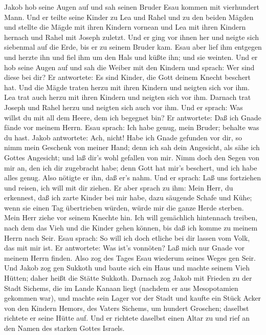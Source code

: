  Jakob hob seine Augen auf und sah seinen Bruder Esau kommen
mit vierhundert Mann. Und er teilte seine Kinder zu Lea und Rahel und zu
den beiden Mägden  und stellte die Mägde mit ihren Kindern
vornean und Lea mit ihren Kindern hernach und Rahel mit Joseph zuletzt.
 Und er ging vor ihnen her und neigte sich siebenmal auf die
Erde, bis er zu seinem Bruder kam.  Esau aber lief ihm
entgegen und herzte ihn und fiel ihm um den Hals und küßte ihn; und sie
weinten.  Und er hob seine Augen auf und sah die Weiber mit
den Kindern und sprach: Wer sind diese bei dir? Er antwortete: Es sind
Kinder, die Gott deinem Knecht beschert hat.  Und die Mägde
traten herzu mit ihren Kindern und neigten sich vor ihm. 
Lea trat auch herzu mit ihren Kindern und neigten sich vor ihm. Darnach
trat Joseph und Rahel herzu und neigten sich auch vor ihm. 
Und er sprach: Was willst du mit all dem Heere, dem ich begegnet bin? Er
antwortete: Daß ich Gnade fände vor meinem Herrn.  Esau
sprach: Ich habe genug, mein Bruder; behalte was du hast. 
Jakob antwortete: Ach, nicht! Habe ich Gnade gefunden vor dir, so nimm
mein Geschenk von meiner Hand; denn ich sah dein Angesicht, als sähe ich
Gottes Angesicht; und laß dir's wohl gefallen von mir. 
Nimm doch den Segen von mir an, den ich dir zugebracht habe; denn Gott
hat mir's beschert, und ich habe alles genug. Also nötigte er ihn, daß
er's nahm.  Und er sprach: Laß uns fortziehen und reisen,
ich will mit dir ziehen.  Er aber sprach zu ihm: Mein Herr,
du erkennest, daß ich zarte Kinder bei mir habe, dazu säugende Schafe
und Kühe; wenn sie einen Tag übertrieben würden, würde mir die ganze
Herde sterben.  Mein Herr ziehe vor seinem Knechte hin. Ich
will gemächlich hintennach treiben, nach dem das Vieh und die Kinder
gehen können, bis daß ich komme zu meinem Herrn nach Seir. 
Esau sprach: So will ich doch etliche bei dir lassen vom Volk, das mit
mir ist. Er antwortete: Was ist's vonnöten? Laß mich nur Gnade vor
meinem Herrn finden.  Also zog des Tages Esau wiederum
seines Weges gen Seir.  Und Jakob zog gen Sukkoth und baute
sich ein Haus und machte seinem Vieh Hütten; daher heißt die Stätte
Sukkoth.  Darnach zog Jakob mit Frieden zu der Stadt
Sichems, die im Lande Kanaan liegt (nachdem er aus Mesopotamien gekommen
war), und machte sein Lager vor der Stadt  und kaufte ein
Stück Acker von den Kindern Hemors, des Vaters Sichems, um hundert
Groschen; daselbst richtete er seine Hütte auf.  Und er
richtete daselbst einen Altar zu und rief an den Namen des starken
Gottes Israels.

